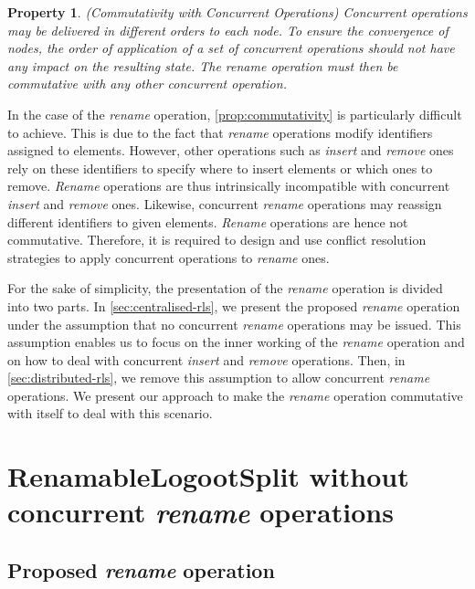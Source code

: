 \documentclass[10pt,journal,compsoc]{IEEEtran}
\newtheorem{property}{Property}
\begin{document}
\begin{property}(Commutativity with Concurrent Operations)
    \label{prop:commutativity}
    Concurrent operations may be delivered in different orders to each node.
    To ensure the convergence of nodes, the order of application of a set of concurrent operations should not have any impact on the resulting state.
    The \emph{rename} operation must then be commutative with any other concurrent operation.
\end{property}

In the case of the \emph{rename} operation, \autoref{prop:commutativity} is particularly difficult to achieve.
This is due to the fact that \emph{rename} operations modify identifiers assigned to elements.
However, other operations such as \emph{insert} and \emph{remove} ones rely on these identifiers to specify where to insert elements or which ones to remove.
\emph{Rename} operations are thus intrinsically incompatible with concurrent \emph{insert} and \emph{remove} ones.
Likewise, concurrent \emph{rename} operations may reassign different identifiers to given elements.
\emph{Rename} operations are hence not commutative.
Therefore, it is required to design and use conflict resolution strategies to apply concurrent operations to \emph{rename} ones.

For the sake of simplicity, the presentation of the \emph{rename} operation is divided into two parts.
In \autoref{sec:centralised-rls}, we present the proposed \emph{rename} operation under the assumption that no concurrent \emph{rename} operations may be issued.
This assumption enables us to focus on the inner working of the \emph{rename} operation and on how to deal with concurrent \emph{insert} and \emph{remove} operations.
Then, in \autoref{sec:distributed-rls}, we remove this assumption to allow concurrent \emph{rename} operations.
We present our approach to make the \emph{rename} operation commutative with itself to deal with this scenario.

\section{RenamableLogootSplit without concurrent \emph{rename} operations}
\label{sec:centralised-rls}

\subsection{Proposed \emph{rename} operation}

\label{sec:rename-op}
\end{document}
